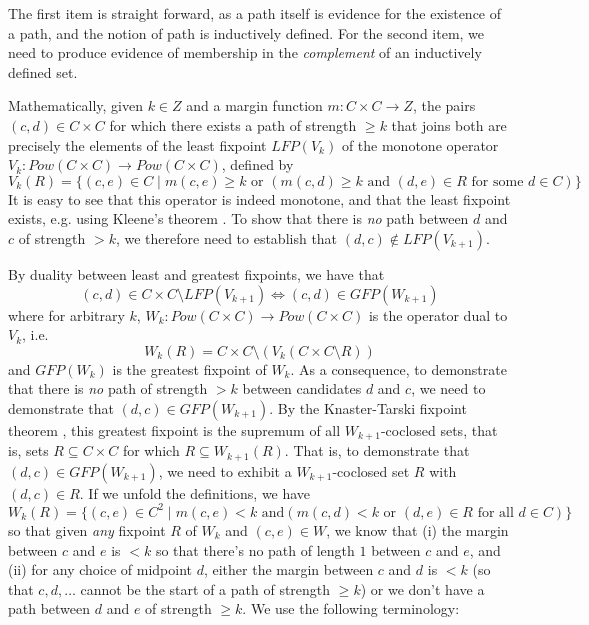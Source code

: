 \noindent
The first item is straight forward, as a path itself is evidence for the
existence of a path, and the notion of path is inductively defined.
For the second item, we need to produce evidence of membership in
the \emph{complement} of an inductively defined set.

Mathematically, given $k \in Z$ and a margin function $m: C \times C
\to Z$, the pairs $(c, d) \in C \times C$ for which there exists a
path of strength $\geq k$ that joins both are precisely the elements
of the least fixpoint $LFP(V_k)$ of the monotone operator $V_k:
Pow(C \times C) \to Pow(C \times C)$, defined by
\[ V_k(R) = \lbrace (c, e) \in C \mid m(c, e) \geq k \mbox{ or }
(m(c, d) \geq k \mbox{ and } (d, e) \in R \mbox{ for some } d \in C)
\rbrace \]
It is easy to see that this operator is indeed monotone, and that
the least fixpoint exists, e.g. using Kleene's theorem
\citep{Stoltenberg-Hansen:1994:MTD}.  To show that there is \emph{no}
path between $d$ and $c$ of strength $> k$, we therefore need to
establish that
$(d, c) \notin LFP(V_{k+1})$.

By duality between least and greatest fixpoints, we have that \[
(c, d) \in C \times C
\setminus LFP(V_{k+1}) \iff (c,d) \in GFP(W_{k+1}) \]
where for arbitrary $k$, $W_k: Pow(C \times C) \to Pow(C \times C)$ is the operator dual
to $V_k$, i.e.
\[ W_k(R) = C \times C \setminus (V_k (C\times C \setminus R)) \]
and $GFP(W_k)$ is the greatest fixpoint of $W_k$.
As a consequence, to demonstrate that there is \emph{no} path of
strength $> k$ between candidates $d$ and $c$, we need to
demonstrate that $(d, c) \in GFP(W_{k+1})$. By the Knaster-Tarski fixpoint
theorem \citep{Tarski:1955:LTF}, this greatest fixpoint is the supremum of all
$W_{k+1}$-coclosed sets, that is, sets $R \subseteq C \times C$ for which
$R \subseteq W_{k+1}(R)$.
That is, to demonstrate that $(d, c) \in GFP(W_{k+1})$, we need
to exhibit a $W_{k+1}$-coclosed set $R$ with $(d, c) \in R$.
If we unfold the definitions, we have
\[ W_k(R) = \lbrace (c, e) \in C^2 \mid m(c, e) < k \mbox{ and
} (m(c, d) < k \mbox{ or } (d,e) \in R \mbox{ for all } d \in C)
\rbrace \]
so that given \emph{any} fixpoint $R$ of $W_k$ and $(c, e) \in W$, we
know that (i) the margin between $c$ and $e$ is $< k$ so that
there's no path of length $1$ between $c$ and $e$, and (ii) for any
choice of midpoint $d$, either the margin between $c$ and $d$ is $<
k$ (so that $c, d, \dots$ cannot be the start of a path of strength
$\geq k$) or we don't have a path between $d$ and $e$ of strength
$\geq k$. We use the following terminology:

